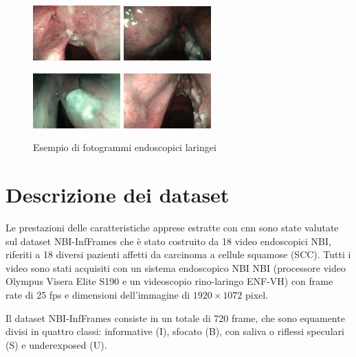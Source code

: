 \begin{figure}[ht]
    \centering
    \includegraphics[width=0.3\textwidth]{introduzione/Larynge-1.jpg}
    \includegraphics[width=0.3\textwidth]{introduzione/Larynge-2.jpg}

    \includegraphics[width=0.3\textwidth]
    {introduzione/Larynge-3.jpg}
    \includegraphics[width=0.3\textwidth]{introduzione/Larynge-4.jpg}
    \caption{Esempio di fotogrammi endoscopici laringei}
    \label{fig:larynges}
\end{figure}

\section{Descrizione dei dataset}\label{descrizione-dei-dataset}

Le prestazioni delle caratteristiche apprese estratte con
\gls{cnn} sono state valutate sul dataset
NBI-InfFrames  che
è stato costruito da 18 video endoscopici NBI, riferiti a
18 diversi pazienti affetti da carcinoma a cellule squamose
(SCC). Tutti i video sono stati acquisiti con un sistema endoscopico NBI
NBI (processore video Olympus Visera Elite S190 e
un videoscopio rino-laringo ENF-VH) con frame rate di
25 fps e dimensioni dell'immagine di \(1920\times 1072\) pixel.

Il dataset NBI-InfFrames consiste in un totale di 720 frame, che sono equamente divisi in quattro classi: informative (I), sfocato (B), con saliva o riflessi speculari (S) e underexposed  (U). 

